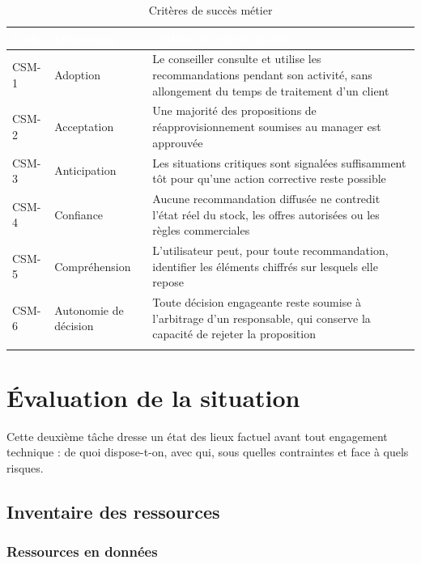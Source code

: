 \begin{longtable}{|P{1.8cm}|P{2.9cm}|P{9.3cm}|}
\hline
{}
\textcolor{white}{\textbf{Code}} &
\textcolor{white}{\textbf{Dimension}} &
\textcolor{white}{\textbf{Critère de succès métier}} \\
\hline
\endhead
\hline
\endfoot
\hline
\endlastfoot
CSM-1 & Adoption & Le conseiller consulte et utilise les recommandations pendant son activité, sans allongement du temps de traitement d'un client \\
\hline
CSM-2 & Acceptation & Une majorité des propositions de réapprovisionnement soumises au manager est approuvée \\
\hline
CSM-3 & Anticipation & Les situations critiques sont signalées suffisamment tôt pour qu'une action corrective reste possible \\
\hline
CSM-4 & Confiance & Aucune recommandation diffusée ne contredit l'état réel du stock, les offres autorisées ou les règles commerciales \\
\hline
CSM-5 & Compréhension & L'utilisateur peut, pour toute recommandation, identifier les éléments chiffrés sur lesquels elle repose \\
\hline
CSM-6 & Autonomie de décision & Toute décision engageante reste soumise à l'arbitrage d'un responsable, qui conserve la capacité de rejeter la proposition \\
\hline
\caption{Critères de succès métier}
\label{tab:criteres-metier-chap2}
\end{longtable}

\section{Évaluation de la situation}

Cette deuxième tâche dresse un état des lieux factuel avant tout engagement technique : de quoi dispose-t-on, avec qui, sous quelles contraintes et face à quels risques.

\subsection{Inventaire des ressources}

\subsubsection{Ressources en données}

